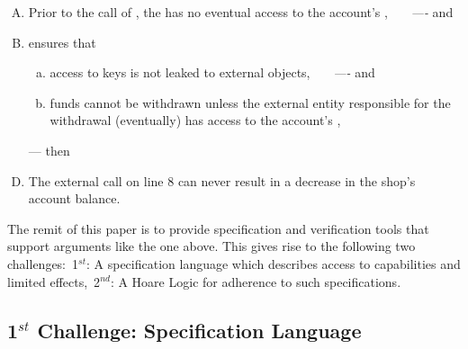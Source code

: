 {\vspace{.05cm}
\begin{enumerate}[(A)]
\item   Prior to the call of  , the   has no eventual access to the account's \password, \ \ \ \emph{----} and
\item  \Mshop ensures that 
\begin{enumerate}[(a)]
\item access to keys is not leaked to external objects, \ \ \ \emph{----} and
\item   funds cannot be withdrawn unless the external entity responsible for the withdrawal (eventually) has  access to the account's \password,
\end{enumerate}
\item[--- then]
\item  The external  call on line 8 can never result in a decrease in the shop's account balance.
\end{enumerate}


 \noindent
The remit of this paper is to provide specification and verification tools that support arguments like the one above.
This gives rise to the following two challenges:\  1$^{st}$:  A specification language which describes access to capabilities and limited effects,\ 
2$^{nd}$: A  Hoare Logic for adherence to such specifications.




 
 
\subsection{1$^{st}$ Challenge: Specification Language} 

}
